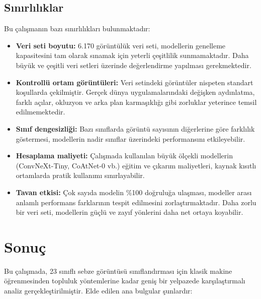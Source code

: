 \documentclass[conference]{IEEEtran}
\begin{document}
\subsection{S{\i}n{\i}rl{\i}l{\i}klar}
Bu \c{c}al{\i}\c{s}man{\i}n baz{\i} s{\i}n{\i}rl{\i}l{\i}klar{\i} bulunmaktad{\i}r:

\begin{itemize}
    \item \textbf{Veri seti boyutu:} 6.170 g\"{o}r\"{u}nt\"{u}l\"{u}k veri seti, modellerin genelleme kapasitesini tam olarak s{\i}namak i\c{c}in yeterli \c{c}e\c{s}itlilik sunmamaktad{\i}r. Daha b\"{u}y\"{u}k ve \c{c}e\c{s}itli veri setleri \"{u}zerinde de\u{g}erlendirme yap{\i}lmas{\i} gerekmektedir.
    \item \textbf{Kontroll\"{u} ortam g\"{o}r\"{u}nt\"{u}leri:} Veri setindeki g\"{o}r\"{u}nt\"{u}ler nispeten standart ko\c{s}ullarda \c{c}ekilmi\c{s}tir. Ger\c{c}ek d\"{u}nya uygulamalar{\i}ndaki de\u{g}i\c{s}ken ayd{\i}nlatma, farkl{\i} a\c{c}{\i}lar, okluzyon ve arka plan karma\c{s}{\i}kl{\i}\u{g}{\i} gibi zorluklar yeterince temsil edilmemektedir.
    \item \textbf{S{\i}n{\i}f dengesizli\u{g}i:} Baz{\i} s{\i}n{\i}flarda g\"{o}r\"{u}nt\"{u} say{\i}s{\i}n{\i}n di\u{g}erlerine g\"{o}re farkl{\i}l{\i}k g\"{o}stermesi, modellerin nadir s{\i}n{\i}flar \"{u}zerindeki performans{\i}n{\i} etkileyebilir.
    \item \textbf{Hesaplama maliyeti:} \c{C}al{\i}\c{s}mada kullan{\i}lan b\"{u}y\"{u}k \"{o}l\c{c}ekli modellerin (ConvNeXt-Tiny, CoAtNet-0 vb.) e\u{g}itim ve \c{c}{\i}kar{\i}m maliyetleri, kaynak k{\i}s{\i}tl{\i} ortamlarda pratik kullan{\i}m{\i} s{\i}n{\i}rlayabilir.
    \item \textbf{Tavan etkisi:} \c{C}ok say{\i}da modelin \%100 do\u{g}rulu\u{g}a ula\c{s}mas{\i}, modeller aras{\i} anlaml{\i} performans farklar{\i}n{\i}n tespit edilmesini zorla\c{s}t{\i}rmaktad{\i}r. Daha zorlu bir veri seti, modellerin g\"{u}\c{c}l\"{u} ve zay{\i}f y\"{o}nlerini daha net ortaya koyabilir.
\end{itemize}

\section{Sonu\c{c}}
Bu \c{c}al{\i}\c{s}mada, 23 s{\i}n{\i}fl{\i} sebze g\"{o}r\"{u}nt\"{u}s\"{u} s{\i}n{\i}fland{\i}rmas{\i} i\c{c}in klasik makine \"{o}\u{g}renmesinden topluluk y\"{o}ntemlerine kadar geni\c{s} bir yelpazede kar\c{s}{\i}la\c{s}t{\i}rmal{\i} analiz ger\c{c}ekle\c{s}tirilmi\c{s}tir. Elde edilen ana bulgular \c{s}unlard{\i}r:
\end{document}
